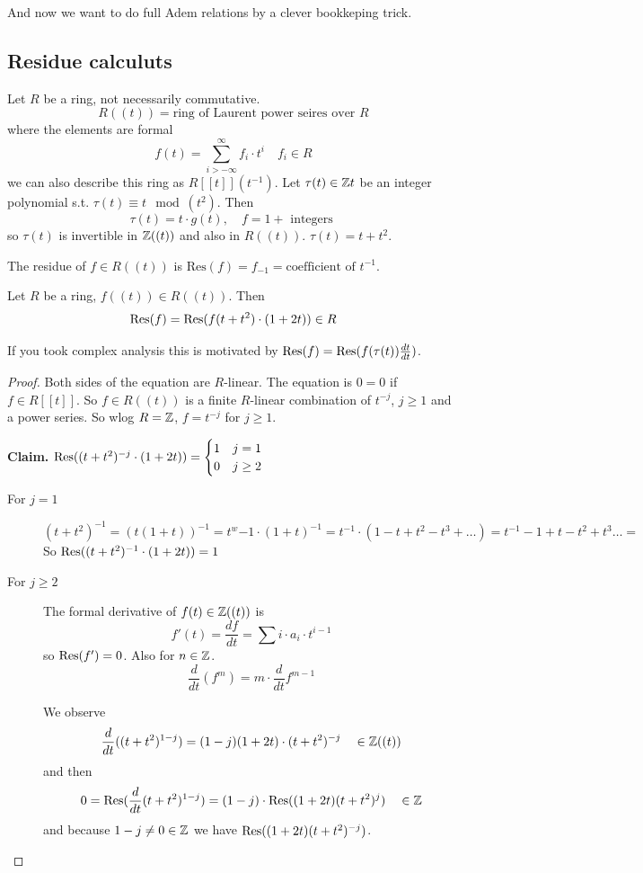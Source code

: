 \documentclass[language=english]{TemplateLecture}
\begin{document}
And now we want to do full Adem relations by a clever bookkeping trick.


\subsection{Residue calculuts}

Let \(R\) be a ring, not necessarily commutative.
\[R((t)) = \text{ring of Laurent power seires over } R\]
where the elements are formal
\[f(t) = \sum_{i> -\infty}^\infty f_i \cdot t^i \quad f_i \in R\]
we can also describe this ring as \(R[[t]](t^{-1})\). Let \(\tau(t)\in \mathbb{Z}{t}\) be an integer polynomial s.t. \(\tau(t) \equiv t \mod (t^2)\). Then
\[\tau(t) = t\cdot g(t), \quad f = 1 + \text{ integers }\]
so \(\tau(t)\) is invertible in \(\mathbb{Z}((t))\) and also in \(R((t))\). \(\tau(t) = t+t^2\).

The residue of \(f \in R((t))\) is \(\mathrm{Res}(f) = f_{-1} = \text{coefficient of }t^{-1}\).

\begin{proposition}
    Let \(R\) be a ring, \(f((t))\in R((t))\). Then
    \[\mathrm{Res}(f) = \mathrm{Res}(f(t+t^2)\cdot(1+2t)) \in R\]
\end{proposition}

If you took complex analysis this is motivated by \(\mathrm{Res}(f) = \mathrm{Res}(f(\tau(t))\frac{dt}{dt})\).

\begin{proof}
    Both sides of the equation are \(R\)-linear. The equation is \(0 = 0\) if \(f\in R[[t]]\). So \(f\in R((t))\) is a finite \(R\)-linear combination of \(t^{-j}\), \(j\geq 1\) and a power series. So wlog \(R= \mathbb{Z}\), \(f = t^{-j}\) for \(j\geq 1\).

    \textbf{Claim.} \(\mathrm{Res}((t+t^2)^{-j} \cdot (1+2t)) = \begin{cases}
        1 & j = 1\\
        0 & j\geq 2 \\
    \end{cases}\)
    \begin{description}
        \item[For \(j = 1\)]  \((t+t^2)^{-1} = (t(1+t))^{-1} = t^w{-1}\cdot(1+t)^{-1} = t^{-1} \cdot (1-t+t^2-t^3+\dots) = t^{-1} -1 + t- t^2 + t^3 \dots = \) So \(\mathrm{Res}((t+t^2)^{-1}\cdot (1+2t)) = 1\)
        \item[For \(j \geq 2\)] The formal derivative of
        \(f(t)\in \mathbb{Z}((t))\)
        is \[f'(t) = \frac{df}{dt} = \sum i\cdot a_i \cdot t^{i-1}\]
        so \(\mathrm{Res}(f') = 0\). Also for \(n\in \mathbb{Z}\).
        \[\frac{d}{dt} (f^m) = m \cdot \frac{d}{dt} f^{m-1}\]

        We observe
        \[\frac{d}{dt}((t+t^2)^{1-j}) = (1-j)(1+2t)\cdot (t+t^2)^{-j} \quad \in \mathbb{Z}((t))\]
        and then
        \[0 = \mathrm{Res}(\frac{d}{dt} (t+t^2)^{1-j}) = (1-j) \cdot \mathrm{Res}((1+2t)(t+t^2)^j) \quad \in \mathbb{Z}\]
        and because \(1-j \neq 0 \in \mathbb{Z}\) we have \(\mathrm{Res}((1+2t)(t+t^2)^{-j})\).
    \end{description}
\end{proof}
\end{document}

